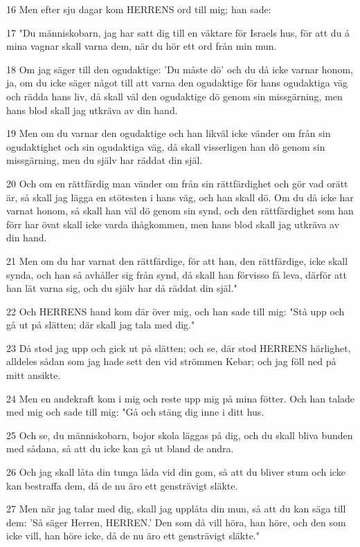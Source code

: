 \par 16 Men efter sju dagar kom HERRENS ord till mig; han sade:
\par 17 "Du människobarn, jag har satt dig till en väktare för Israels hus, för att du å mina vagnar skall varna dem, när du hör ett ord från min mun.
\par 18 Om jag säger till den ogudaktige: 'Du måste dö' och du då icke varnar honom, ja, om du icke säger något till att varna den ogudaktige för hans ogudaktiga väg och rädda hans liv, då skall väl den ogudaktige dö genom sin missgärning, men hans blod skall jag utkräva av din hand.
\par 19 Men om du varnar den ogudaktige och han likväl icke vänder om från sin ogudaktighet och sin ogudaktiga väg, då skall visserligen han dö genom sin missgärning, men du själv har räddat din själ.
\par 20 Och om en rättfärdig man vänder om från sin rättfärdighet och gör vad orätt är, så skall jag lägga en stötesten i hans väg, och han skall dö. Om du då icke har varnat honom, så skall han väl dö genom sin synd, och den rättfärdighet som han förr har övat skall icke varda ihågkommen, men hans blod skall jag utkräva av din hand.
\par 21 Men om du har varnat den rättfärdige, för att han, den rättfärdige, icke skall synda, och han så avhåller sig från synd, då skall han förvisso få leva, därför att han lät varna sig, och du själv har då räddat din själ."
\par 22 Och HERRENS hand kom där över mig, och han sade till mig: "Stå upp och gå ut på slätten; där skall jag tala med dig."
\par 23 Då stod jag upp och gick ut på slätten; och se, där stod HERRENS härlighet, alldeles sådan som jag hade sett den vid strömmen Kebar; och jag föll ned på mitt ansikte.
\par 24 Men en andekraft kom i mig och reste upp mig på mina fötter. Och han talade med mig och sade till mig: "Gå och stäng dig inne i ditt hus.
\par 25 Och se, du människobarn, bojor skola läggas på dig, och du skall bliva bunden med sådana, så att du icke kan gå ut bland de andra.
\par 26 Och jag skall låta din tunga låda vid din gom, så att du bliver stum och icke kan bestraffa dem, då de nu äro ett gensträvigt släkte.
\par 27 Men när jag talar med dig, skall jag upplåta din mun, så att du kan säga till dem: 'Så säger Herren, HERREN.' Den som då vill höra, han höre, och den som icke vill, han höre icke, då de nu äro ett gensträvigt släkte."

